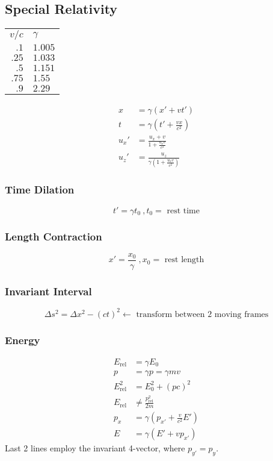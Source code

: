 \documentclass[10pt,a4paper]{article}
\begin{document}
\subsection{Special Relativity}

\begin{tabular}{ r l }
  $v/c$ & $\gamma$\\
  $.1$ & $1.005$\\
  $.25$ & $1.033$\\
  $.5$ & $1.151$\\
  $.75$ & $1.55$\\
  $.9$ & $2.29$\\
\end{tabular}

\begin{align}
 x &= \gamma(x' + vt')\\
 t &= \gamma \left( t' + \frac{vx}{c^2} \right) \\
 u_x' &= \frac{u_x + v}{1+\frac{u_xv}{c^2}}\\
 u_z' &= \frac{u_z}{ \gamma \left( 1+\frac{u_xv}{c^2} \right)}
\end{align}

\subsubsection{Time Dilation}
\begin{equation}
 t' = \gamma t_0~,t_0 =\textrm{ rest time}
\end{equation}
\subsubsection{Length Contraction}
\begin{equation}
 x' = \frac{x_0}{\gamma}~, x_0= \textrm{ rest length}
\end{equation}

\subsubsection{Invariant Interval}
\begin{equation}
 \Delta s^2 = \Delta x^2 -(ct)^2 \leftarrow \textrm{ transform between 2 moving frames}
\end{equation}

\subsubsection{Energy}
\begin{align}
 E_{\textrm{rel}} &= \gamma E_0\\
p &= \gamma p = \gamma mv\\
E_{\textrm{rel}}^2 &= E_0^2 + (pc)^2\\
E_{\textrm{rel}} &\neq \frac{p^2_{\textrm{rel}}}{2m}\\
p_x &= \gamma \left( p_{x'} + \frac{v}{c^2}E' \right)\\
E &= \gamma \left( E' + vp_{x'} \right) 
\end{align}
Last 2 lines employ the invariant 4-vector, where $p_{y'} = p_y$.
\end{document}

